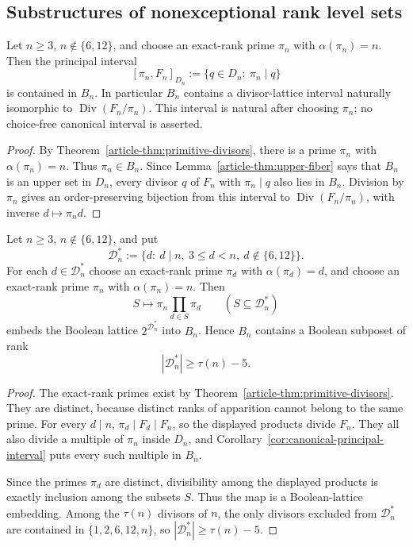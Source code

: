 \subsection*{Substructures of nonexceptional rank level sets}

\begin{corollary}\label{cor:canonical-principal-interval}
Let $n\ge3$, $n\notin\{6,12\}$, and choose an exact-rank prime $\pi_n$ with
$\alpha(\pi_n)=n$. Then the principal interval
\[
[\pi_n,F_n]_{D_n}:=\{q\in D_n:\ \pi_n\mid q\}
\]
is contained in $B_n$. In particular $B_n$ contains a divisor-lattice
interval naturally isomorphic to $\operatorname{Div}(F_n/\pi_n)$. This
interval is natural after choosing $\pi_n$; no choice-free canonical interval
is asserted.
\end{corollary}

\begin{proof}
By Theorem~\ref{article-thm:primitive-divisors}, there is a prime
$\pi_n$ with $\alpha(\pi_n)=n$. Thus $\pi_n\in B_n$. Since
Lemma~\ref{article-thm:upper-fiber} says that $B_n$ is an upper set in $D_n$,
every divisor $q$ of $F_n$ with $\pi_n\mid q$ also lies in $B_n$. Division by
$\pi_n$ gives an order-preserving bijection from this interval to
$\operatorname{Div}(F_n/\pi_n)$, with inverse $d\mapsto \pi_n d$.
\end{proof}

\begin{corollary}\label{cor:boolean-skeleton}
Let $n\ge3$, $n\notin\{6,12\}$, and put
\[
\mathcal D_n^*:=\{d:\ d\mid n,\ 3\le d<n,\ d\notin\{6,12\}\}.
\]
For each $d\in\mathcal D_n^*$ choose an exact-rank prime
$\pi_d$ with $\alpha(\pi_d)=d$, and choose an exact-rank prime
$\pi_n$ with $\alpha(\pi_n)=n$. Then
\[
S\longmapsto \pi_n\prod_{d\in S}\pi_d
\qquad(S\subseteq\mathcal D_n^*)
\]
embeds the Boolean lattice $2^{\mathcal D_n^*}$ into $B_n$. Hence
$B_n$ contains a Boolean subposet of rank
\[
|\mathcal D_n^*|\ge \tau(n)-5.
\]
\end{corollary}

\begin{proof}
The exact-rank primes exist by Theorem~\ref{article-thm:primitive-divisors}. They
are distinct, because distinct ranks of apparition cannot belong to the
same prime. For every $d\mid n$, $\pi_d\mid F_d\mid F_n$, so the displayed
products divide $F_n$. They all also divide a multiple of $\pi_n$ inside
$D_n$, and Corollary~\ref{cor:canonical-principal-interval} puts every such
multiple in $B_n$.

Since the primes $\pi_d$ are distinct, divisibility among the displayed
products is exactly inclusion among the subsets $S$. Thus the map is a
Boolean-lattice embedding. Among the $\tau(n)$ divisors of $n$, the only
divisors excluded from $\mathcal D_n^*$ are contained in
$\{1,2,6,12,n\}$, so $|\mathcal D_n^*|\ge\tau(n)-5$.
\end{proof}

